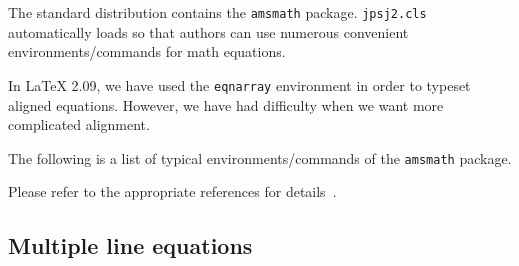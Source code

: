 \documentclass{jpsj2}
\begin{document}
The standard \LaTeXe{} distribution contains the \texttt{amsmath} package. \texttt{jpsj2.cls} automatically loads so that authors can use numerous convenient environments/commands for math equations.

In \LaTeX{} 2.09, we have used the \texttt{eqnarray} environment in order to typeset aligned equations.  However, we have had difficulty when we want more complicated alignment.

The following is a list of typical environments/commands of the \texttt{amsmath} package.

Please refer to the appropriate references for details~\cite{companion,linebyline}.

\subsection{Multiple line equations}
\end{document}
